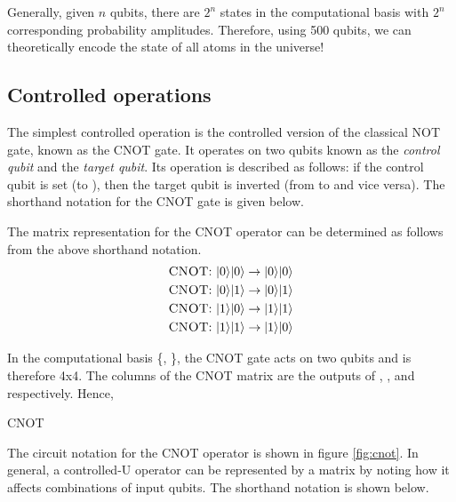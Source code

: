 Generally, given $n$ qubits, there are $2^n$ states in the computational basis with $2^n$ corresponding probability amplitudes. Therefore, using 500 qubits, we can theoretically encode the state of all atoms in the universe!

\subsection{Controlled operations}
The simplest controlled operation is the controlled version of the classical \textsc{NOT} gate, known as the \textsc{CNOT} gate. It operates on two qubits known as the \textit{control qubit} and the \textit{target qubit}. Its operation is described as follows: if the control qubit is set (to ), then the target qubit is inverted (from  to  and vice versa). The shorthand notation for the \textsc{CNOT} gate is given below.

\beq
{}  \rightarrow {}
\eeq

The matrix representation for the \textsc{CNOT} operator can be determined as follows from the above shorthand notation.
\begin{align}
\text{\textsc{CNOT}: } |0\rangle|0\rangle &\rightarrow |0\rangle|0\rangle\\
\text{\textsc{CNOT}: } |0\rangle|1\rangle &\rightarrow |0\rangle|1\rangle\\
\text{\textsc{CNOT}: } |1\rangle|0\rangle &\rightarrow |1\rangle|1\rangle\\
\text{\textsc{CNOT}: } |1\rangle|1\rangle &\rightarrow |1\rangle|0\rangle
\end{align}

In the computational basis \{, \}, the \textsc{CNOT} gate acts on two qubits and is therefore 4x4. The columns of the \textsc{CNOT} matrix are the outputs of , ,  and  respectively. Hence,

\beq
\textsc{CNOT} \equiv {}
\eeq


The circuit notation for the \textsc{CNOT} operator is shown in figure \ref{fig:cnot}. In general, a controlled-U operator can be represented by a matrix by noting how it affects combinations of input qubits. The shorthand notation is shown below.

